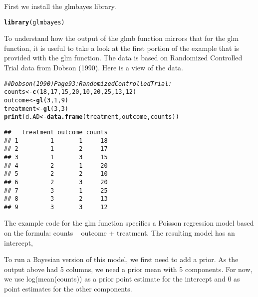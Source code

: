 \documentclass{article}\usepackage[]{graphicx}\usepackage[]{color}
\makeatletter
\newcommand{\hlnum}[1]{\textcolor[rgb]{0.686,0.059,0.569}{#1}}%
\newcommand{\hlcom}[1]{\textcolor[rgb]{0.678,0.584,0.686}{\textit{#1}}}%
\newcommand{\hlstd}[1]{\textcolor[rgb]{0.345,0.345,0.345}{#1}}%
\newcommand{\hlkwb}[1]{\textcolor[rgb]{0.69,0.353,0.396}{#1}}%
\newcommand{\hlkwd}[1]{\textcolor[rgb]{0.737,0.353,0.396}{\textbf{#1}}}%
\newenvironment{kframe}{%
 \def\at@end@of@kframe{}%
 \ifinner\ifhmode%
  \def\at@end@of@kframe{\end{minipage}}%
  \begin{minipage}{\columnwidth}%
 \fi\fi%
 \def\FrameCommand##1{\hskip\@totalleftmargin \hskip-\fboxsep
 \colorbox{shadecolor}{##1}\hskip-\fboxsep
     \hskip-\linewidth \hskip-\@totalleftmargin \hskip\columnwidth}%
 \MakeFramed {\advance\hsize-\width
   \@totalleftmargin\z@ \linewidth\hsize
   \@setminipage}}%
 {\par\unskip\endMakeFramed%
 \at@end@of@kframe}
\newenvironment{knitrout}{}{} %
\makeatother
\begin{document}
First we install the glmbayes library.

\begin{knitrout}
\color{fgcolor}\begin{kframe}
\begin{alltt}
\hlkwd{library}\hlstd{(glmbayes)}
\end{alltt}
\end{kframe}
\end{knitrout}

To understand how the output of the glmb function mirrors that for the glm function, it is useful to take a look at the first portion of the example that is provided with the glm function. The data is based on Randomized Controlled Trial data from Dobson (1990). Here is a view of the data.

\begin{knitrout}
\color{fgcolor}\begin{kframe}
\begin{alltt}
\hlcom{## Dobson (1990) Page 93: Randomized Controlled Trial :}
\hlstd{counts} \hlkwb{<-} \hlkwd{c}\hlstd{(}\hlnum{18}\hlstd{,}\hlnum{17}\hlstd{,}\hlnum{15}\hlstd{,}\hlnum{20}\hlstd{,}\hlnum{10}\hlstd{,}\hlnum{20}\hlstd{,}\hlnum{25}\hlstd{,}\hlnum{13}\hlstd{,}\hlnum{12}\hlstd{)}
\hlstd{outcome} \hlkwb{<-} \hlkwd{gl}\hlstd{(}\hlnum{3}\hlstd{,}\hlnum{1}\hlstd{,}\hlnum{9}\hlstd{)}
\hlstd{treatment} \hlkwb{<-} \hlkwd{gl}\hlstd{(}\hlnum{3}\hlstd{,}\hlnum{3}\hlstd{)}
\hlkwd{print}\hlstd{(d.AD} \hlkwb{<-} \hlkwd{data.frame}\hlstd{(treatment, outcome, counts))}
\end{alltt}
\begin{verbatim}
##   treatment outcome counts
## 1         1       1     18
## 2         1       2     17
## 3         1       3     15
## 4         2       1     20
## 5         2       2     10
## 6         2       3     20
## 7         3       1     25
## 8         3       2     13
## 9         3       3     12
\end{verbatim}
\end{kframe}
\end{knitrout}

The example code for the glm function specifies a Poisson regression model based on the formula: counts ~ outcome + treatment.  The resulting model has an intercept, 


To run a Bayesian version of this model, we first need to add a prior. As the output above had 5 columns, we need a prior mean with 5 components. For now, we use log(mean(counts)) as a prior point estimate for the intercept and 0 as point estimates for the other components. 
\end{document}
